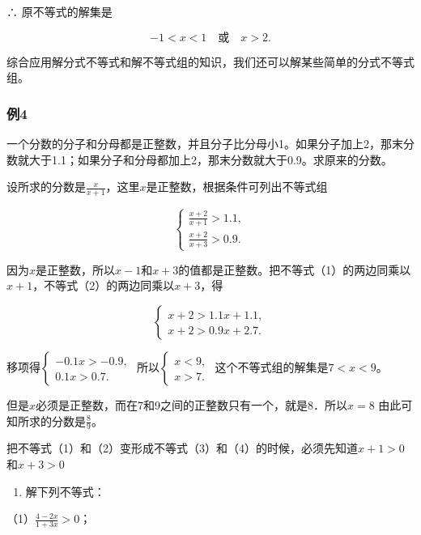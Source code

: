 ∴ 原不等式的解集是

\[
- 1 < x < 1 \quad \text{或} \quad x > 2.
\]

综合应用解分式不等式和解不等式组的知识，我们还可以解某些简单的分式不等式组。

\subsubsection{例4}

一个分数的分子和分母都是正整数，并且分子比分母小1。如果分子加上2，那末分数就大于1.1；如果分子和分母都加上2，那末分数就大于0.9。求原来的分数。

设所求的分数是\(\frac{x}{x + 1}\)，这里\(x\)是正整数，根据条件可列出不等式组

\[
\left\{ \begin{array}{l} \frac{x + 2}{x + 1} > 1.1, \\ \frac{x + 2}{x + 3} > 0.9. \end{array} \right. \tag {1}
\]

因为\(x\)是正整数，所以\(x - 1\)和\(x + 3\)的值都是正整数。把不等式（1）的两边同乘以\(x+1\)，不等式（2）的两边同乘以\(x + 3\)，得

\[
\left\{ \begin{array}{l} x + 2 > 1.1 x + 1.1, \\ x + 2 > 0.9 x + 2.7. \end{array} \right. \tag {3}
\]

移项得\(\left\{ \begin{array}{l} -0.1x > -0.9,\\ 0.1x > 0.7. \end{array} \right.\)
所以\(\left\{ \begin{array}{l} x < 9, \\ x > 7. \end{array} \right.\)
这个不等式组的解集是\(7 < x < 9\)。

但是\(x\)必须是正整数，而在7和9之间的正整数只有一个，就是8．所以\(x = 8\)
由此可知所求的分数是\(\frac{8}{9}\)。

把不等式（1）和（2）变形成不等式（3）和（4）的时候，必须先知道\(x + 1 > 0\)和\(x + 3 > 0\)

\begin{enumerate}
\item
  解下列不等式：
\end{enumerate}

（1）\(\frac{4 - 2x}{1 + 3x} > 0\)；

